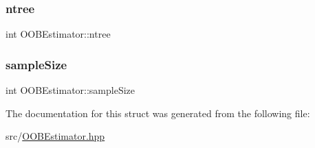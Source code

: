\mbox{\label{structOOBEstimator_af09c508b17686ca379d67affa1f31333}} 
\subsubsection{\texorpdfstring{ntree}{ntree}}
{\footnotesize\ttfamily int O\+O\+B\+Estimator\+::ntree}

\mbox{\label{structOOBEstimator_a199a3bf3234bd967e061b1c61a56aed6}} 
\subsubsection{\texorpdfstring{sample\+Size}{sampleSize}}
{\footnotesize\ttfamily int O\+O\+B\+Estimator\+::sample\+Size}



The documentation for this struct was generated from the following file\+:\begin{DoxyCompactItemize}
\item 
src/\hyperlink{OOBEstimator_8hpp}{O\+O\+B\+Estimator.\+hpp}\end{DoxyCompactItemize}
